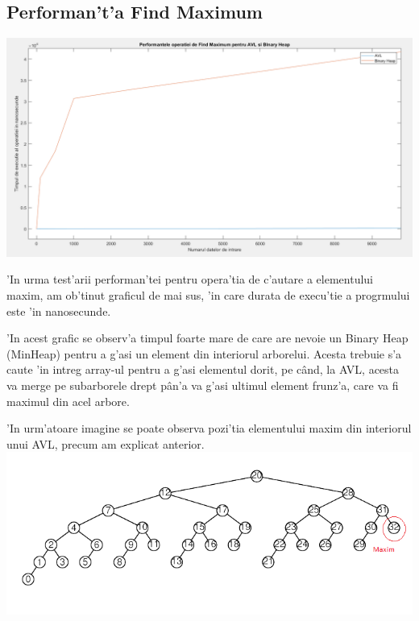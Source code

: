 \documentclass[titlepage,12pt]{article}
\numberwithin{figure}{section}
\begin{document}
\subsection{Performan't'a Find Maximum}
\includegraphics[scale=0.5]{FM}
\\ \par 'In urma test'arii performan'tei pentru opera'tia de c'autare a elementului maxim, am ob'tinut graficul de mai sus, 'in care durata de execu'tie a progrmului este 'in nanosecunde.
\par 'In acest grafic se observ'a timpul foarte mare de care are nevoie un Binary Heap (MinHeap) pentru a g'asi un element din interiorul arborelui. Acesta trebuie s'a caute 'in intreg array-ul pentru a g'asi elementul dorit, pe c\^and, la AVL, acesta va merge pe subarborele drept p\^an'a va g'asi ultimul element frunz'a, care va fi maximul din acel arbore.
\par 'In urm'atoare imagine se poate observa pozi'tia elementului maxim din interiorul unui AVL, precum am explicat anterior.
\\
\includegraphics[scale=1]{Maxim}
\end{document}
